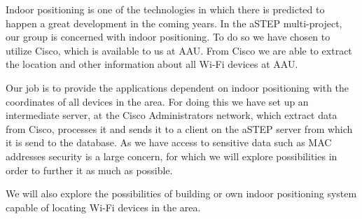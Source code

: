 
Indoor positioning is one of the technologies in which there is predicted to happen a great development in the coming years. In the aSTEP multi-project, our group is concerned with indoor positioning. To do so we have chosen to utilize Cisco, which is available to us at AAU. From Cisco we are able to extract the location and other information about all Wi-Fi devices at AAU.

Our job is to provide the applications dependent on indoor positioning with the coordinates of all devices in the area. For doing this we have set up an intermediate server, at the Cisco Administrators network, which extract data from Cisco, processes it and sends it to a client on the aSTEP server from which it is send to the database. As we have access to sensitive data such as MAC addresses security is a large concern, for which we will explore possibilities in order to further it as much as possible.

We will also explore the possibilities of building or own indoor positioning system capable of locating Wi-Fi devices in the area.



